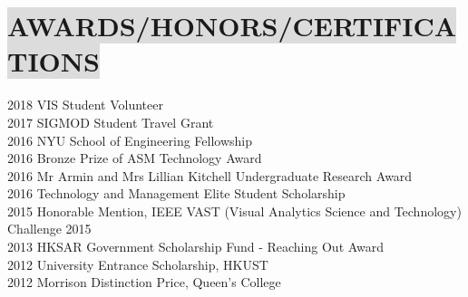 \section*{
    \colorbox{gainsboro}{AWARDS/HONORS/CERTIFICATIONS}
}

2018 \hspace{9mm} 
VIS Student Volunteer
\\
2017 \hspace{9mm} 
SIGMOD Student Travel Grant
\\
2016 \hspace{9mm} 
NYU School of Engineering Fellowship
\\
2016 \hspace{9mm} 
Bronze Prize of ASM Technology Award
\\
2016 \hspace{9mm} 
Mr Armin and Mrs Lillian Kitchell Undergraduate Research Award
\\
2016 \hspace{9mm} 
Technology and Management Elite Student Scholarship
\\
2015 \hspace{9mm} 
Honorable Mention, IEEE VAST (Visual Analytics Science and Technology) Challenge 2015
\\
2013 \hspace{9mm} 
HKSAR Government Scholarship Fund - Reaching Out Award
\\
2012 \hspace{9mm}
University Entrance Scholarship, HKUST
\\
2012 \hspace{9mm}
Morrison Distinction Price, Queen's College
